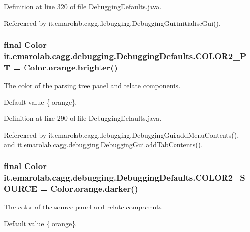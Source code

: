 Definition at line 320 of file Debugging\-Defaults.\-java.



Referenced by it.\-emarolab.\-cagg.\-debugging.\-Debugging\-Gui.\-initialise\-Gui().

\hypertarget{classit_1_1emarolab_1_1cagg_1_1debugging_1_1DebuggingDefaults_a48fc98475576b4f27c6b95531d7a4367}{
\subsubsection[{C\-O\-L\-O\-R2\-\_\-\-P\-T}]{\setlength{\rightskip}{0pt plus 5cm}final Color it.\-emarolab.\-cagg.\-debugging.\-Debugging\-Defaults.\-C\-O\-L\-O\-R2\-\_\-\-P\-T = Color.\-orange.\-brighter()\hspace{0.3cm}{\ttfamily [static]}}}\label{classit_1_1emarolab_1_1cagg_1_1debugging_1_1DebuggingDefaults_a48fc98475576b4f27c6b95531d7a4367}
The color of the parsing tree panel and relate components. \par
 Default value \{ orange\}. 

Definition at line 290 of file Debugging\-Defaults.\-java.



Referenced by it.\-emarolab.\-cagg.\-debugging.\-Debugging\-Gui.\-add\-Menu\-Contents(), and it.\-emarolab.\-cagg.\-debugging.\-Debugging\-Gui.\-add\-Tab\-Contents().

\hypertarget{classit_1_1emarolab_1_1cagg_1_1debugging_1_1DebuggingDefaults_ad8a29b271e97836a8d707dd93f0fb553}{
\subsubsection[{C\-O\-L\-O\-R2\-\_\-\-S\-O\-U\-R\-C\-E}]{\setlength{\rightskip}{0pt plus 5cm}final Color it.\-emarolab.\-cagg.\-debugging.\-Debugging\-Defaults.\-C\-O\-L\-O\-R2\-\_\-\-S\-O\-U\-R\-C\-E = Color.\-orange.\-darker()\hspace{0.3cm}{\ttfamily [static]}}}\label{classit_1_1emarolab_1_1cagg_1_1debugging_1_1DebuggingDefaults_ad8a29b271e97836a8d707dd93f0fb553}
The color of the source panel and relate components. \par
 Default value \{ orange\}. 

